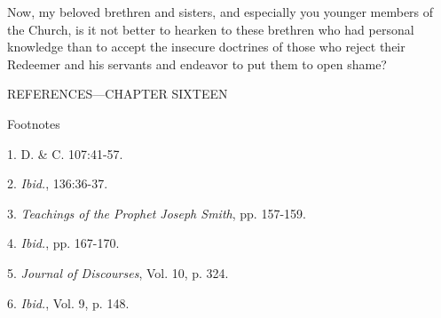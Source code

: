 Now, my beloved brethren and sisters, and especially you younger members of the Church, is
it not better to hearken to these brethren who had personal knowledge than to accept the
insecure doctrines of those who reject their Redeemer and his servants and endeavor to put
them to open shame?

\newpage
REFERENCES—CHAPTER SIXTEEN

Footnotes

1. D. \& C. 107:41-57.

2. \textit{Ibid.}, 136:36-37.

3. \textit{Teachings of the Prophet Joseph Smith}, pp. 157-159.

4. \textit{Ibid.}, pp. 167-170.

5. \textit{Journal of Discourses}, Vol. 10, p. 324.

6. \textit{Ibid.}, Vol. 9, p. 148.

